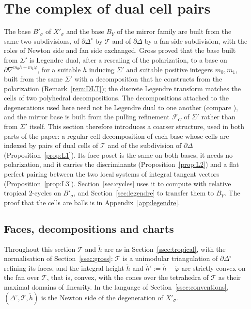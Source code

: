 \section{The complex of dual cell pairs}\label{sec:dualpair}

The base $B'_\sigma$ of $X'_\sigma$ and the base $B_Y$ of the mirror family are built from the same two subdivisions,
of $\partial\Delta^\circ$ by $\mathcal T$ and of $\partial\Delta$ by a fan-side subdivision, with the roles of Newton side and fan side
exchanged. Gross proved that the base built from $\Sigma'$ is Legendre dual, after a rescaling of the polarization, to a
base on $\partial\nabla^{m_0h+m_1\varphi}$, for a suitable $h$ inducing $\Sigma'$ and suitable positive integers $m_0,m_1$, built from the
same $\Sigma'$ with a decomposition that he constructs from the polarization \cite[Thms.~3.21, 3.25, 3.26]{Gross2005}
(Remark~\ref{rem:DLT}); the discrete Legendre transform matches the cells of two polyhedral decompositions. The
decompositions attached to the degenerations used here need not be Legendre dual to one another (compare
\cite[\S3, after Rem.~3.18]{Gross2005}), and the mirror base is built from the pulling refinement $\mathcal F_C$ of
$\Sigma'$ rather than from $\Sigma'$ itself. This section therefore introduces a coarser structure, used in both parts of
the paper: a regular cell decomposition of each base whose cells are indexed by pairs of dual cells of $\mathcal T$ and of
the subdivision of $\partial\Delta$ (Proposition~\ref{prop:L1}). Its face poset is the same on both bases, it needs no
polarization, and it carries the discriminants (Proposition~\ref{prop:L2}) and a flat perfect pairing between the two
local systems of integral tangent vectors (Proposition~\ref{prop:L3}). Section~\ref{sec:cycles} uses it to compute with
relative tropical $2$-cycles on $B'_\sigma$, and Section~\ref{sec:legendre} to transfer them to $B_Y$. The proof that the
cells are balls is in Appendix~\ref{app:legendre}.

\subsection{Faces, decompositions and charts}\label{ssec:leg-setting}
Throughout this section $\mathcal T$ and $\check h$ are as in Section~\ref{ssec:tropical}, with the normalisation of
Section~\ref{ssec:gross}: $\mathcal T$ is a unimodular triangulation of $\partial\Delta^\circ$ refining its faces, and the
integral height $\check h$ and $\check h':=\check h-\check\varphi$ are strictly convex on the fan over $\mathcal T$, that is,
convex, with the cones over the tetrahedra of $\mathcal T$ as their maximal domains of linearity. In the language of
Section~\ref{ssec:conventions}, $(\Delta^\circ,\mathcal T,\check h)$ is the Newton side of the degeneration of $X'_\sigma$.

